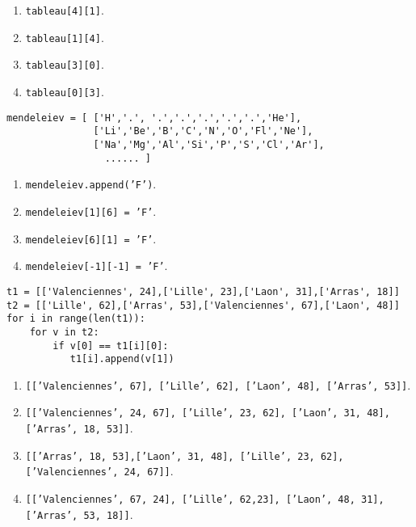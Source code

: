 \documentclass[t,10pt]{article}
\begin{document}
\begin{enumerate}
\item \texttt{tableau[4][1]}.
\item \texttt{tableau[1][4]}.
\item \texttt{tableau[3][0]}. %
\item \texttt{tableau[0][3]}.
\end{enumerate}

\begin{lstlisting}
mendeleiev = [ ['H','.', '.','.','.','.','.','He'],
               ['Li','Be','B','C','N','O','Fl','Ne'],
               ['Na','Mg','Al','Si','P','S','Cl','Ar'],
                 ...... ]
\end{lstlisting}
\begin{enumerate}
\item \texttt{mendeleiev.append('F')}.
\item \texttt{mendeleiev[1][6] = 'F'}. %
\item \texttt{mendeleiev[6][1] = 'F'}.
\item \texttt{mendeleiev[-1][-1] = 'F'}.
\end{enumerate}

\begin{lstlisting}
t1 = [['Valenciennes', 24],['Lille', 23],['Laon', 31],['Arras', 18]]
t2 = [['Lille', 62],['Arras', 53],['Valenciennes', 67],['Laon', 48]]
for i in range(len(t1)):
    for v in t2:
        if v[0] == t1[i][0]:
           t1[i].append(v[1])
\end{lstlisting}
\begin{enumerate}
\item \texttt{[['Valenciennes', 67], ['Lille', 62], ['Laon', 48], ['Arras', 53]]}.
\item \texttt{[['Valenciennes', 24, 67], ['Lille', 23, 62], ['Laon', 31, 48], ['Arras', 18, 53]]}. %
\item \texttt{[['Arras', 18, 53],['Laon', 31, 48], ['Lille', 23, 62], ['Valenciennes', 24, 67]]}.
\item \texttt{[['Valenciennes', 67, 24], ['Lille', 62,23], ['Laon', 48, 31], ['Arras', 53, 18]]}.
\end{enumerate}
\end{document}
